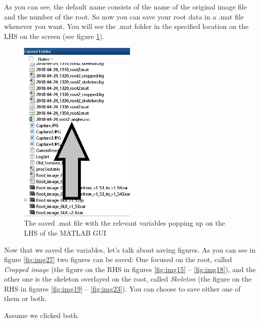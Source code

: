 As you can see, the default name consists of the name of the original image file and the number of the root. 
So now you can save your root data in a .mat file whenever you want. You will see the .mat folder in the specified location on the LHS on the screen (see figure \ref{fig:img26}).

\begin{figure}[H]
	\centering
	\includegraphics[width=0.5\textwidth]{../Figures/manual/save3.jpg}
	\caption{The saved .mat file with the relevant variables popping up on the LHS of the MATLAB GUI}
	\label{fig:img26}
\end{figure}

Now that we saved the variables, let's talk about saving figures. As you can see in figure \ref{fig:img27} two figures can be saved: One focused on the root, called \textit{Cropped image} (the figure on the RHS in figures \ref{fig:img15} -- \ref{fig:img18}), and the other one is the skeleton overlayed on the root, called \textit{Skeleton} (the figure on the RHS in figures \ref{fig:img19} -- \ref{fig:img23}).
You can choose to save either one of them or both.

Assume we clicked both.

